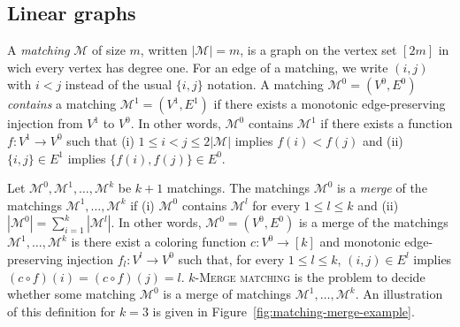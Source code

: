 \subsection*{\textbf{Linear graphs}}

A \emph{matching} $\mathcal{M}$ of size $m$, written $|\mathcal{M}| = m$, 
is a graph on the vertex set $[2m]$ in wich every vertex has degree one.
For an edge of a matching, we write $(i, j)$ with $i < j$ instead of the usual $\{i, j\}$ 
notation.
A matching $\mathcal{M}^0 = (V^0, E^0)$ \emph{contains} a matching 
$\mathcal{M}^1 = (V^1, E^1)$ if there exists a monotonic edge-preserving injection from $V^1$ to $V^0$.
In other words, $\mathcal{M}^0$ contains $\mathcal{M}^1$ if there exists a function 
$f : V^1 \to V^0$ such that 
(i) $1 \leq i < j \leq 2|\mathcal{M}|$ implies $f(i) < f(j)$ and  
(ii) $\{i,j\} \in E^1$ implies $\{f(i), f(j)\} \in E^0$.

Let $\mathcal{M}^0, \mathcal{M}^1, \dots, \mathcal{M}^k$ be $k+1$ matchings.
The matchings $\mathcal{M}^0$ is a \emph{merge} of the matchings 
$\mathcal{M}^1, \dots, \mathcal{M}^k$ 
if 
(i) $\mathcal{M}^0$ contains $\mathcal{M}^l$ for every $1 \leq l \leq k$ 
and 
(ii) $\left|\mathcal{M}^0\right| = \sum_{i=1}^{k} \left|\mathcal{M}^l\right|$.
In other words,  $\mathcal{M}^0 = (V^0, E^0)$ is a merge of the matchings 
$\mathcal{M}^1, \dots, \mathcal{M}^k$ is there exist a coloring function
$c : V^0 \to [k]$  and monotonic edge-preserving injection $f_l : V^l \to V^0$ 
such that, for every $1 \leq l \leq k$,
$(i, j) \in E^l$ implies $(c \circ f)(i) = (c \circ f)(j) = l$.
\textsc{$k$-Merge matching} is the problem to decide whether some matching 
$\mathcal{M}^0$ is a merge of matchings $\mathcal{M}^1, \dots, \mathcal{M}^k$.
An illustration of this definition for $k = 3$ is given in Figure~\ref{fig:matching-merge-example}.


